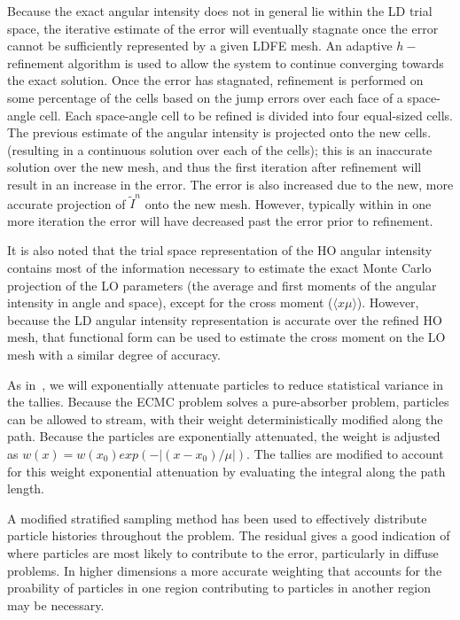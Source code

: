 \documentclass{mc2013}
\begin{document}
Because the exact angular intensity does not in general lie within the LD trial space, the
iterative estimate of the error will eventually stagnate once the error cannot be sufficiently
represented by a given LDFE mesh.  An adaptive $h-$refinement algorithm is used
to allow the system to continue converging towards the exact solution.  Once the
error has stagnated, refinement is performed on some percentage of the cells
based on the jump errors over each face of a space-angle cell.  Each space-angle cell
to be refined is divided into four equal-sized cells.  The previous estimate of the
angular intensity is projected onto the new cells.(resulting in a continuous solution over
each of the cells); this is an inaccurate solution over the new mesh, and thus the
first iteration after refinement will result in an increase in the error.  The error
is also increased due to the new, more accurate projection of $\tilde I^n$ onto the
new mesh.  However, typically within in one more iteration the error will have
decreased past the error prior to refinement.  

 It is also noted that the trial space
representation of the HO angular intensity contains most of the information necessary to
estimate the exact Monte Carlo projection of the LO parameters (the average and first moments of the angular intensity
in angle and space), except for the cross moment ($\langle x \mu \rangle$).  However,
because the LD angular intensity representation is accurate over the refined HO mesh, that
functional form can be used to estimate the cross moment on the LO mesh with a
similar degree of accuracy.  


As in~\cite{cwd}, we will exponentially attenuate particles to reduce statistical
variance in the tallies.  Because the ECMC problem solves a pure-absorber problem,
particles can be allowed to stream, with their weight deterministically modified
along the path.  Because the particles are exponentially attenuated, the weight is
adjusted as $w(x) = w(x_0)exp(-|(x-x_0)/\mu|)$.  The tallies are modified to account
for this weight exponential attenuation by evaluating the integral along the path
length. 


A modified stratified sampling method has been used to effectively distribute particle
histories throughout the problem. The residual gives a good indication of where
particles are most likely to contribute to the error, particularly in diffuse
problems.  In higher dimensions a more accurate weighting that accounts for the
proability of particles in one region contributing to particles in another region may
be necessary.  
\end{document}
